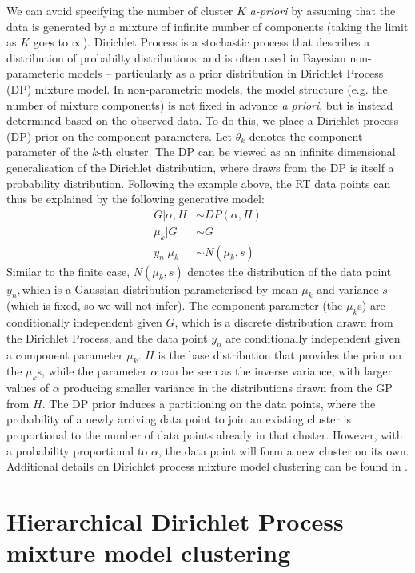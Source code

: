 We can avoid specifying the number of cluster $K$ \emph{a-priori }by assuming that the data is generated by a mixture of infinite number of components (taking the limit as $K$ goes to $\infty$). Dirichlet Process is a stochastic process that describes a distribution of probabilty distributions, and is often used in Bayesian non-parameteric models -- particularly as a prior distribution in Dirichlet Process (DP) mixture model. In non-parametric models, the model structure (e.g. the number of mixture components) is not fixed in advance \textit{a priori}, but is instead determined based on the observed data. To do this, we place a Dirichlet process (DP) prior on the component parameters. Let $\theta_{k}$ denotes the component parameter of the $k$-th cluster. The DP can be viewed as an infinite dimensional generalisation of the Dirichlet distribution, where draws from the DP is itself a probability distribution. Following the example above, the RT data points can thus be explained by the following generative model:
\begin{align}
G|\alpha,H & \sim DP(\alpha,H)\\
\mu_{k}|G & \sim G\\
y_{n}|\mu_{k} & \sim{N}(\mu_{k},s)
\end{align}
Similar to the finite case, ${N}(\mu_{k},s)$ denotes the distribution of the data point $y_{n},$which is a Gaussian distribution parameterised by mean $\mu_{k}$ and variance $s$ (which is fixed, so we will not infer). The component parameter (the $\mu_{k}$s) are conditionally independent given $G$, which is a discrete distribution drawn from the Dirichlet Process, and the data point $y_{n}$ are conditionally independent given a component parameter $\mu_{k}$. $H$ is the base distribution that provides the prior on the $\mu_{k}$s, while the parameter $\alpha$ can be seen as the inverse variance, with larger values of $\alpha$ producing smaller variance in the distributions drawn from the GP from $H$. The DP prior induces a partitioning on the data points, where the probability of a newly arriving data point to join an existing cluster is proportional to the number of data points already in that cluster. However, with a probability proportional to $\alpha$, the data point will form a new cluster on its own. Additional details on Dirichlet process mixture model clustering can be found in \cite{Rasmussen2000}. 

\section{Hierarchical Dirichlet Process mixture model clustering\label{background-hdp-clustering}}

